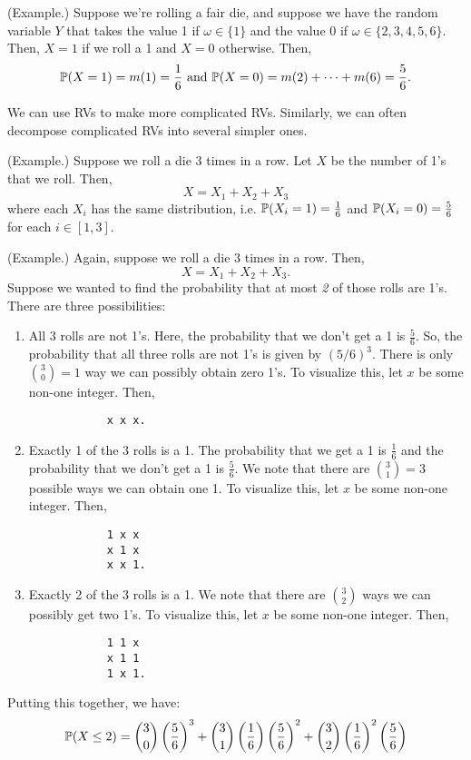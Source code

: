 \documentclass[letterpaper]{article}
\begin{document}
\begin{mdframed}[]
    (Example.) Suppose we're rolling a fair die, and suppose we have the random variable $Y$ that takes the value 1 if $\omega \in \{1\}$ and the value 0 if $\omega \in \{2, 3, 4, 5, 6\}$. Then, $X = 1$ if we roll a 1 and $X = 0$ otherwise. Then,
    \[\mathbb{P}(X = 1) = m(1) = \frac{1}{6} \text{ and } \mathbb{P}(X = 0) = m(2) + \dots + m(6) = \frac{5}{6}.\]
\end{mdframed}

We can use RVs to make more complicated RVs. Similarly, we can often decompose complicated RVs into several simpler ones. 

\begin{mdframed}[]
    (Example.) Suppose we roll a die 3 times in a row. Let $X$ be the number of 1's that we roll. Then, 
    \[X = X_1 + X_2 + X_3\]
    where each $X_i$ has the same distribution, i.e. $\mathbb{P}(X_i = 1) = \frac{1}{6}$ and $\mathbb{P}(X_i = 0) = \frac{5}{6}$ for each $i \in [1, 3]$. 
\end{mdframed}

\begin{mdframed}[]
    (Example.) Again, suppose we roll a die 3 times in a row. Then, 
    \[X = X_1 + X_2 + X_3.\]
    Suppose we wanted to find the probability that at most \emph{2} of those rolls are 1's. There are three possibilities: 
    \begin{enumerate}[\hspace{0.5cm}(a)]
        \item All 3 rolls are not 1's. Here, the probability that we don't get a 1 is $\frac{5}{6}$. So, the probability that all three rolls are not 1's is given by $(5 / 6)^3$. There is only $\binom{3}{0} = 1$ way we can possibly obtain zero 1's. To visualize this, let $x$ be some non-one integer. Then,
        \begin{verbatim}
            x x x.\end{verbatim}
        \item Exactly 1 of the 3 rolls is a 1. The probability that we get a 1 is $\frac{1}{6}$ and the probability that we don't get a 1 is $\frac{5}{6}$. We note that there are $\binom{3}{1} = 3$ possible ways we can obtain one 1. To visualize this, let $x$ be some non-one integer. Then,
        \begin{verbatim}
            1 x x
            x 1 x
            x x 1.\end{verbatim}
        \item Exactly 2 of the 3 rolls is a 1. We note that there are $\binom{3}{2}$ ways we can possibly get two 1's.  To visualize this, let $x$ be some non-one integer. Then,
        \begin{verbatim}
            1 1 x
            x 1 1
            1 x 1.\end{verbatim}
    \end{enumerate}
    Putting this together, we have: 
    \[\mathbb{P}(X \leq 2) = \binom{3}{0} \left(\frac{5}{6}\right)^3 + \binom{3}{1} \left(\frac{1}{6}\right) \left(\frac{5}{6}\right)^2 + \binom{3}{2}\left(\frac{1}{6}\right)^2 \left(\frac{5}{6}\right)\]
\end{mdframed}
\end{document}
